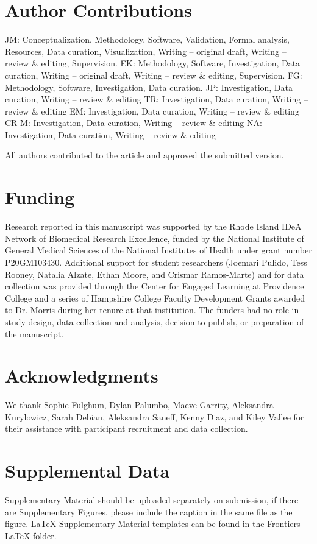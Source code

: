 \documentclass[utf8]{FrontiersinHarvard} %
\begin{document}
\section*{Author Contributions}
JM: Conceptualization, Methodology, Software, Validation, Formal analysis, Resources, Data curation, Visualization, Writing – original draft, Writing – review \& editing, Supervision.
EK: Methodology, Software, Investigation, Data curation, Writing – original draft, Writing – review \& editing, Supervision.
FG: Methodology, Software, Investigation, Data curation.
JP: Investigation, Data curation,  Writing – review \& editing
TR: Investigation, Data curation,  Writing – review \& editing
EM: Investigation, Data curation,  Writing – review \& editing
CR-M: Investigation, Data curation,  Writing – review \& editing
NA: Investigation, Data curation,  Writing – review \& editing

All authors contributed to the article and approved the submitted version.

\section*{Funding}
Research reported in this manuscript was supported by the Rhode Island IDeA Network of Biomedical Research Excellence, funded by the National Institute of General Medical Sciences of the National Institutes of Health under grant number P20GM103430. Additional support for student researchers (Joemari Pulido, Tess Rooney, Natalia Alzate, Ethan Moore, and Crismar Ramos-Marte) and for data collection was provided through the Center for Engaged Learning at Providence College and a series of Hampshire College Faculty Development Grants awarded to Dr. Morris during her tenure at that institution. The funders had no role in study design, data collection and analysis, decision to publish, or preparation of the manuscript.


\section*{Acknowledgments}
We thank Sophie Fulghum, Dylan Palumbo, Maeve Garrity, Aleksandra Kurylowicz, Sarah Debian, Aleksandra Saneff, Kenny Diaz, and Kiley Vallee for their assistance with participant recruitment and data collection.

\section*{Supplemental Data}
 \href{http://home.frontiersin.org/about/author-guidelines#SupplementaryMaterial}{Supplementary Material} should be uploaded separately on submission, if there are Supplementary Figures, please include the caption in the same file as the figure. LaTeX Supplementary Material templates can be found in the Frontiers LaTeX folder.
\end{document}

